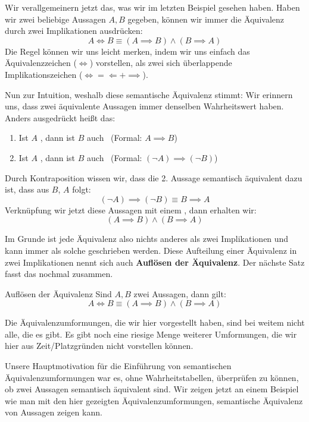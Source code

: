 \documentclass[../../main.tex]{subfiles}
\begin{document}
    Wir verallgemeinern jetzt das, was wir im letzten Beispiel gesehen haben.
     Haben wir zwei beliebige Aussagen $A,B$ gegeben, können wir immer die Äquivalenz
     durch zwei Implikationen ausdrücken:
    \[A \iff B \equiv (A \implies B) \land (B \implies A)\]
    Die Regel können wir uns leicht merken, indem wir uns einfach das Äquivalenzzeichen
    ($\iff$) vorstellen, als zwei sich überlappende Implikationszeichen ($\iff = \Longleftarrow + \implies$).

    Nun zur Intuition, weshalb diese semantische Äquivalenz stimmt: Wir erinnern uns, dass zwei äquivalente Aussagen 
    immer denselben Wahrheitswert haben. Anders ausgedrückt heißt das:
    \begin{enumerate}
        \item Ist $A$ \wahr, dann ist $B$ auch \wahr\  (Formal: $A \implies B$)
        \item Ist $A$ \falsch, dann ist $B$ auch \falsch\  (Formal: $(\lnot A) \implies (\lnot B)$)
    \end{enumerate}
    Durch Kontraposition wissen wir, dass die 2. Aussage semantisch äquivalent dazu ist,
    dass aus $B$, $A$ folgt:
    \[(\lnot A) \implies (\lnot B) \equiv B \implies A\]
    Verknüpfung wir jetzt diese Aussagen mit einem , dann erhalten wir:
    \[(A \implies B) \land (B \implies A)\]
    
    Im Grunde ist jede Äquivalenz also nichts anderes als zwei Implikationen und kann immer als solche geschrieben werden. 
    Diese Aufteilung einer Äquivalenz in zwei Implikationen nennt sich auch \textbf{Auflösen der Äquivalenz}.
    Der nächste Satz fasst das nochmal zusammen.
    
    \begin{lemma}{Auflösen der Äquivalenz}
    Sind $A,B$ zwei Aussagen, dann gilt:
        \[ A \iff B \equiv (A \implies B) \land (B \implies A)\]
    \end{lemma}

    Die Äquivalenzumformungen, die wir hier vorgestellt haben, sind bei weitem nicht alle, die es gibt. Es gibt
    noch eine riesige Menge weiterer Umformungen, die wir hier aus Zeit/Platzgründen nicht vorstellen können.
    
    Unsere Hauptmotivation für die Einführung von semantischen Äquivalenzumformungen war es, ohne
    Wahrheitstabellen, überprüfen zu können, ob zwei Aussagen semantisch äquivalent sind. 
    Wir zeigen jetzt an einem Beispiel wie man mit den hier gezeigten Äquivalenzumformungen, semantische Äquivalenz von 
    Aussagen zeigen kann.
\end{document}
